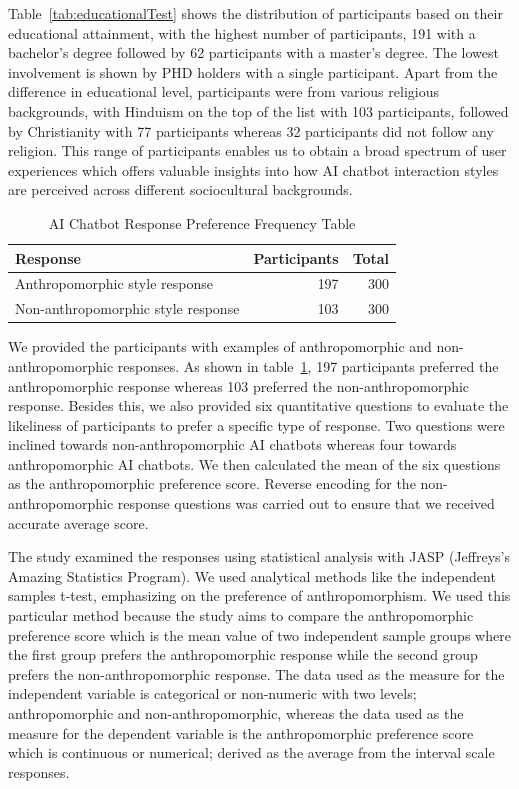 \documentclass[conference]{IEEEtran}
\begin{document}
Table~\ref{tab:educationalTest} shows the distribution of participants based on their educational attainment, with the highest number of participants, 191 with a bachelor’s degree followed by 62 participants with a master’s degree. The lowest involvement is shown by PHD holders with a single participant. Apart from the difference in educational level, participants were from various religious backgrounds, with Hinduism on the top of the list with 103 participants, followed by Christianity with 77 participants whereas 32 participants did not follow any religion. This range of participants enables us to obtain a broad spectrum of user experiences which offers valuable insights into how AI chatbot interaction styles are perceived across different sociocultural backgrounds.

\begin{table}[ht]
    \centering
    \caption{AI Chatbot Response Preference Frequency Table}
    \label{tab:anthropomorphicTest}
    \begin{tabular}{lrr}
        \toprule
        \textbf{Response} & \textbf{Participants} & \textbf{Total} \\
        \midrule
        Anthropomorphic style response & 197 & 300 \\
		Non-anthropomorphic style response & 103 & 300 \\
        \bottomrule
    \end{tabular}
\end{table}

We provided the participants with examples of anthropomorphic and non-anthropomorphic responses. As shown in table~\ref{tab:anthropomorphicTest}, 197 participants preferred the anthropomorphic response whereas 103 preferred the non-anthropomorphic response. Besides this, we also provided six quantitative questions to evaluate the likeliness of participants to prefer a specific type of response. Two questions were inclined towards non-anthropomorphic AI chatbots whereas four towards anthropomorphic AI chatbots. We then calculated the mean of the six questions as the anthropomorphic preference score. Reverse encoding for the non-anthropomorphic response questions was carried out to ensure that we received accurate average score. \par
The study examined the responses using statistical analysis with JASP (Jeffreys's Amazing Statistics Program). We used analytical methods like the independent samples t-test, emphasizing on the preference of anthropomorphism. We used this particular method because the study aims to compare the anthropomorphic preference score which is the mean value of two independent sample groups where the first group prefers the anthropomorphic response while the second group prefers the non-anthropomorphic response. The data used as the measure for the independent variable is categorical or non-numeric with two levels; anthropomorphic and non-anthropomorphic, whereas the data used as the measure for the dependent variable is the anthropomorphic preference score which is continuous or numerical; derived as the average from the interval scale responses. \\
\end{document}
